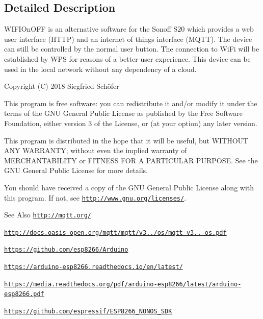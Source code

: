 \subsection{Detailed Description}
W\-I\-F\-I\-On\-O\-F\-F is an alternative software for the Sonoff S20 which provides a web user interface (H\-T\-T\-P) and an internet of things interface (M\-Q\-T\-T). The device can still be controlled by the normal user button. The connection to Wi\-Fi will be established by W\-P\-S for reasons of a better user experience. This device can be used in the local network without any dependency of a cloud.

Copyright (C) 2018 Siegfried Schöfer

This program is free software\-: you can redistribute it and/or modify it under the terms of the G\-N\-U General Public License as published by the Free Software Foundation, either version 3 of the License, or (at your option) any later version.

This program is distributed in the hope that it will be useful, but W\-I\-T\-H\-O\-U\-T A\-N\-Y W\-A\-R\-R\-A\-N\-T\-Y; without even the implied warranty of M\-E\-R\-C\-H\-A\-N\-T\-A\-B\-I\-L\-I\-T\-Y or F\-I\-T\-N\-E\-S\-S F\-O\-R A P\-A\-R\-T\-I\-C\-U\-L\-A\-R P\-U\-R\-P\-O\-S\-E. See the G\-N\-U General Public License for more details.

You should have received a copy of the G\-N\-U General Public License along with this program. If not, see \href{http://www.gnu.org/licenses/}{\tt http\-://www.\-gnu.\-org/licenses/}.

\begin{DoxySeeAlso}{See Also}
\href{http://mqtt.org/}{\tt http\-://mqtt.\-org/} 

\href{http://docs.oasis-open.org/mqtt/mqtt/v3.1.1/os/mqtt-v3.1.1-os.pdf}{\tt http\-://docs.\-oasis-\/open.\-org/mqtt/mqtt/v3../os/mqtt-\/v3..-\/os.\-pdf} 

\href{https://github.com/esp8266/Arduino}{\tt https\-://github.\-com/esp8266/\-Arduino} 

\href{https://arduino-esp8266.readthedocs.io/en/latest/}{\tt https\-://arduino-\/esp8266.\-readthedocs.\-io/en/latest/} 

\href{https://media.readthedocs.org/pdf/arduino-esp8266/latest/arduino-esp8266.pdf}{\tt https\-://media.\-readthedocs.\-org/pdf/arduino-\/esp8266/latest/arduino-\/esp8266.\-pdf} 

\href{https://github.com/espressif/ESP8266_NONOS_SDK}{\tt https\-://github.\-com/espressif/\-E\-S\-P8266\-\_\-\-N\-O\-N\-O\-S\-\_\-\-S\-D\-K} 
\end{DoxySeeAlso}


